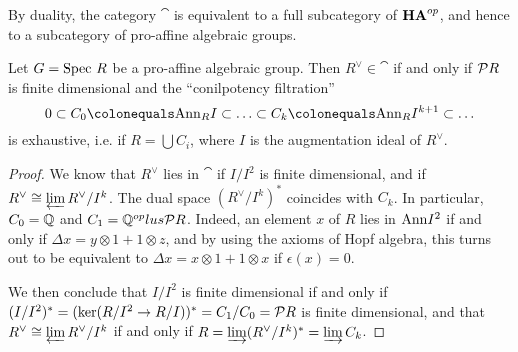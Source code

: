 
%

By duality, the category  $\cat$ is equivalent to a full subcategory of $\operatorname{\bf{HA}}^{op}$, and hence to a subcategory of pro-affine algebraic groups.

\begin{prop}
Let $G=\mathrm{Spec}~ R$ be a pro-affine algebraic group. Then $R^\vee\in\cat$ if and only if $\mathcal{P} R$ is finite dimensional and the ``conilpotency filtration''
\begin{equation}\label{cf}
0\subset C_0 \colonequals\Ann_R I\subset\ldots\subset C_k \colonequals\Ann_R I^{k+1}\subset\ldots
\end{equation}
is exhaustive, i.e. if $R=\bigcup C_i$, where $I$ is the augmentation ideal of $R^\vee$.
\end{prop}

\begin{proof}
We know that $R^\vee$ lies in $\cat$ if $I/I^2$ is finite dimensional, and if $R^\vee\cong\varprojlim R^\vee/I^k$. The dual space $(R^\vee/I^k)^*$ coincides with $C_k$. In particular, $C_0=\mathbb{Q}$ and $C_1=\mathbb{Q}^{op}lus\mathcal{P} R$. Indeed, an element $x$ of $R$ lies in $\mathrm{Ann} I^2$ if and only if $\Delta x=y\otimes 1+1\otimes z$, and by using the axioms of Hopf algebra, this turns out to be equivalent to $\Delta x=x\otimes 1+1\otimes x$ if $\epsilon(x)=0$.

We then conclude that $I/I^2$ is finite dimensional if and only if $(I/I^2)^*=(\ker (R/I^2\to R/I))^*=C_1/C_0=\mathcal{P} R$ is finite dimensional, and that $R^\vee\cong\varprojlim R^\vee/I^k$ if and only if $R=\varinjlim(R^\vee/I^k)^*=\varinjlim C_k$.
\end{proof}

